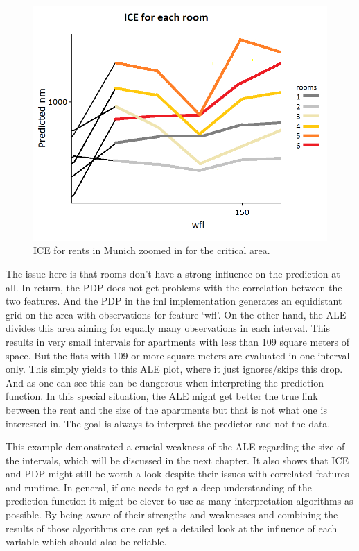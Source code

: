 \documentclass[]{krantz}
\begin{document}
\begin{figure}
\includegraphics[width=1\linewidth]{images/ale_1_ice_zoomed} \caption{ICE for rents in Munich zoomed in for the
critical area.}\label{fig:iceZoomedRents}
\end{figure}




The issue here is that rooms don't have a strong influence on the
prediction at all. In return, the PDP does not get problems with the
correlation between the two features. And the PDP in the iml
implementation generates an equidistant grid on the area with
observations for feature `wfl'. On the other hand, the ALE divides this
area aiming for equally many observations in each interval. This results
in very small intervals for apartments with less than 109 square meters
of space. But the flats with 109 or more square meters are evaluated in
one interval only. This simply yields to this ALE plot, where it just
ignores/skips this drop. And as one can see this can be dangerous when
interpreting the prediction function. In this special situation, the ALE
might get better the true link between the rent and the size of the
apartments but that is not what one is interested in. The goal is always
to interpret the predictor and not the data.

This example demonstrated a crucial weakness of the ALE regarding the
size of the intervals, which will be discussed in the next chapter. It
also shows that ICE and PDP might still be worth a look despite their
issues with correlated features and runtime. In general, if one needs to
get a deep understanding of the prediction function it might be clever
to use as many interpretation algorithms as possible. By being aware of
their strengths and weaknesses and combining the results of those
algorithms one can get a detailed look at the influence of each variable
which should also be reliable.
\end{document}
